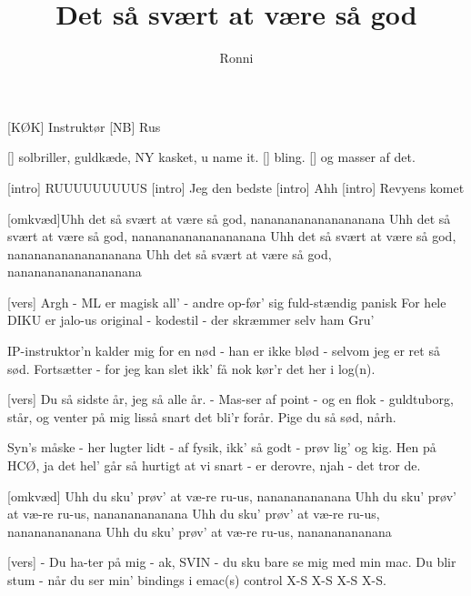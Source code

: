 \documentclass[a4paper,11pt]{article}
\title{Det så svært at være så god}
\author{Ronni}
\begin{document}
\maketitle

\begin{roles}
[KØK] Instruktør
[NB] Rus
\end{roles}

\begin{props}
[] solbriller, guldkæde, NY kasket, u name it.
[] bling.
[] og masser af det.
\end{props}

\begin{song}
[intro] RUUUUUUUUUS
[intro] Jeg den bedste
[intro] Ahh
[intro] Revyens komet

[omkvæd]Uhh det så svært at være så god, nananananananananana
Uhh det så svært at være så god, nananananananananana
Uhh det så svært at være så god, nananananananananana
Uhh det så svært at være så god, nananananananananana

[vers] Argh - ML er magisk
all' - andre op-før' sig fuld-stændig panisk
For hele DIKU er jalo-us
original - kodestil - der skræmmer selv ham Gru'

IP-instruktor'n kalder mig for en nød
- han er ikke blød - selvom jeg er ret så sød.
Fortsætter - for jeg kan slet ikk' få nok
kør'r det her i log(n).

[vers] Du så sidste år, jeg så alle år.
- Mas-ser af point - og en flok - guldtuborg,
står, og venter på mig lisså snart det bli'r forår.
Pige du så sød, nårh.

Syn's måske - her lugter lidt - af fysik,
ikk' så godt - prøv lig' og kig.
Hen på HCØ, ja det hel' går så hurtigt
at vi snart - er derovre, njah - det tror de.

[omkvæd] Uhh du sku' prøv' at væ-re ru-us, nanananananana
Uhh du sku' prøv' at væ-re ru-us, nanananananana
Uhh du sku' prøv' at væ-re ru-us, nanananananana
Uhh du sku' prøv' at væ-re ru-us, nanananananana

[vers] - Du ha-ter på mig - ak,
SVIN - du sku bare se mig med min mac.
Du blir stum - når du ser min' bindings i emac(s)
control X-S X-S X-S X-S.


\end{song}
\end{document}
